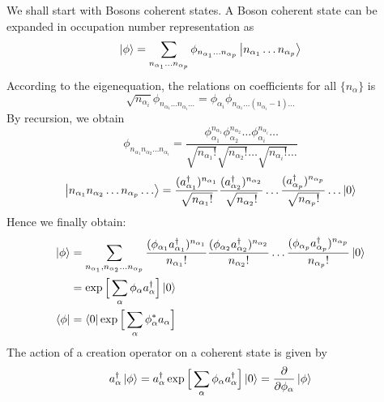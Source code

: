 \documentclass[12pt]{article}
\begin{document}
We shall start with Bosons coherent states. A Boson coherent state can be expanded 
in occupation number representation as
\begin{equation*}
    \ket{\phi}=\sum_{n_{\alpha_1}\dots n_{\alpha_p}}
    \phi_{n_{\alpha_1}\dots n_{\alpha_p}}\ket{n_{\alpha_1}\dots n_{\alpha_p}}
\end{equation*}
According to the eigenequation, the relations on coefficients for all $\{n_\alpha\}$ 
is
\begin{equation*}
    \sqrt{n_{\alpha_i}}\phi_{n_{\alpha_1}\dots n_{\alpha_i}\dots}
    =\phi_{\alpha_i}\phi_{n_{\alpha_1}\dots (n_{\alpha_i}-1)\dots}
\end{equation*}
By recursion, we obtain
\begin{equation*}
    \phi_{n_{\alpha_1}n_{\alpha_2}\dots n_{\alpha_i}}=
    \frac{\phi^{n_{\alpha_1}}_{\alpha_1}\phi^{n_{\alpha_2}}_{\alpha_2}\dots
    \phi^{n_{\alpha_i}}_{\alpha_i}\dots}{\sqrt{n_{\alpha_1}!}\sqrt{n_{\alpha_2}!}
    \dots\sqrt{n_{\alpha_i}!}\dots}
\end{equation*}
\begin{equation*}
    \ket{n_{\alpha_1}n_{\alpha_2}\dots n_{\alpha_p}\dots}=
    \frac{(a^\dagger_{\alpha_1})^{n_{\alpha_1}}}{\sqrt{n_{\alpha_1}!}}
    \frac{(a^\dagger_{\alpha_2})^{n_{\alpha_2}}}{\sqrt{n_{\alpha_2}!}}\dots
    \frac{(a^\dagger_{\alpha_p})^{n_{\alpha_p}}}{\sqrt{n_{\alpha_p}!}}\dots\ket{0}
\end{equation*}
Hence we finally obtain:
\begin{equation*}
    \begin{split}
        \ket{\phi}&=\sum_{n_{\alpha_1},n_{\alpha_2}\dots n_{\alpha_p}}
        \frac{(\phi_{\alpha_1}a^\dagger_{\alpha_1})^{n_{\alpha_1}}}{n_{\alpha_1}!}
        \frac{(\phi_{\alpha_2}a^\dagger_{\alpha_2})^{n_{\alpha_2}}}{n_{\alpha_2}!}
        \dots\frac{(\phi_{\alpha_p}a^\dagger_{\alpha_p})^{n_{\alpha_p}}}
        {n_{\alpha_p}!}\ket{0}\\
        &=\exp\Big[\sum_\alpha\phi_\alpha a^\dagger_\alpha\Big]\ket{0}\\
        \bra{\phi}&=\bra{0}\exp\Big[\sum_\alpha\phi^*_\alpha a_\alpha\Big]
    \end{split}
\end{equation*}
The action of a creation operator on a coherent state is given by
\begin{equation*}
    a^\dagger_\alpha\ket{\phi}=a^\dagger_\alpha
    \exp\Big[\sum_\alpha\phi_\alpha a^\dagger_\alpha\Big]\ket{0}
    =\frac{\partial}{\partial\phi_\alpha}\ket{\phi}
\end{equation*}
\end{document}
